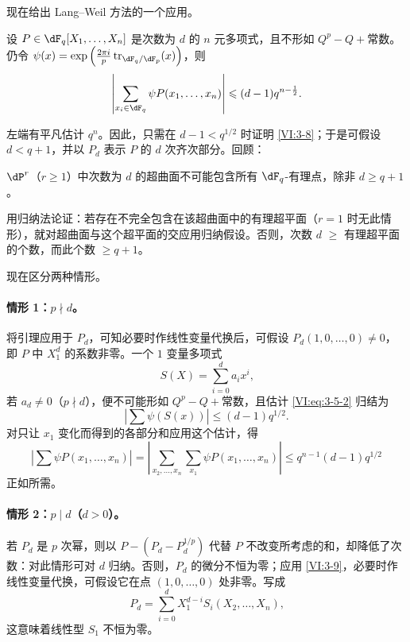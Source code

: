 现在给出 Lang--Weil 方法的一个应用。

\begin{proposition_}\label{VI:3-8}
设 $P\in \dF_q[X_1,\dots,X_n]$ 是次数为 $d$ 的 $n$ 元多项式，且不形如 $Q^p-Q+\text{常数}$。仍令 $\psi(x) = \exp\left(\frac{2\pi i}{p} \tr_{\dF_q/\dF_p}(x)\right)$，则
\[
  \left|\sum_{x_i\in \dF_q} \psi P(x_1,\dots,x_n)\right| \leqslant (d-1) q^{n-\frac 1 2} \text{.}
\]
\end{proposition_}

左端有平凡估计 $q^n$。因此，只需在 $d-1<q^{1/2}$ 时证明 \ref{VI:3-8}；于是可假设 $d<q+1$，并以 $P_d$ 表示 $P$ 的 $d$ 次齐次部分。回顾：

\begin{lemma_}\label{VI:3-9}
$\dP^r$（$r\geqslant 1$）中次数为 $d$ 的超曲面不可能包含所有 $\dF_q$-有理点，除非 $d\geqslant q+1$。
\end{lemma_}

用归纳法论证：若存在不完全包含在该超曲面中的有理超平面（$r=1$ 时无此情形），就对超曲面与这个超平面的交应用归纳假设。否则，次数 $d$ $\geqslant$ 有理超平面的个数，而此个数 $\geqslant q+1$。

现在区分两种情形。

\paragraph{情形 1：$p\nmid d$。}
将引理应用于 $P_d$，可知必要时作线性变量代换后，可假设\newline
$P_d(1,0,\ldots,0)\ne 0$，即 $P$ 中 $X_1^d$ 的系数非零。一个 $1$ 变量多项式
\[
  S(X) = \sum_{i=0}^d a_i x^i \text{,}
\]
若 $a_d\ne 0$（$p\nmid d$），便不可能形如 $Q^p-Q+\text{常数}$，且估计 \eqref{VI:eq:3-5-2} 归结为
\[
  \left| \sum \psi(S(x)) \right| \leqslant (d-1) q^{1/2} \text{.}
\]
对只让 $x_1$ 变化而得到的各部分和应用这个估计，得
\[
  \left| \sum \psi P(x_1,\dots,x_n) \right| = \left| \sum_{x_2,\dots,x_n} \sum_{x_1} \psi P(x_1,\dots,x_n)\right| \leqslant q^{n-1} (d-1) q^{1/2}
\]
正如所需。

\paragraph{情形 2：$p\mid d$（$d>0$）。}
若 $P_d$ 是 $p$ 次幂，则以 $P-(P_d-P_d^{1/p})$ 代替 $P$ 不改变所考虑的和，却降低了次数：对此情形可对 $d$ 归纳。否则，$P_d$ 的微分不恒为零；应用 \ref{VI:3-9}，必要时作线性变量代换，可假设它在点 $(1,0,\dots,0)$ 处非零。写成
\[
  P_d = \sum_{i=0}^d X_1^{d-i} S_i(X_2,\dots,X_n) \text{,}
\]
这意味着线性型 $S_1$ 不恒为零。

